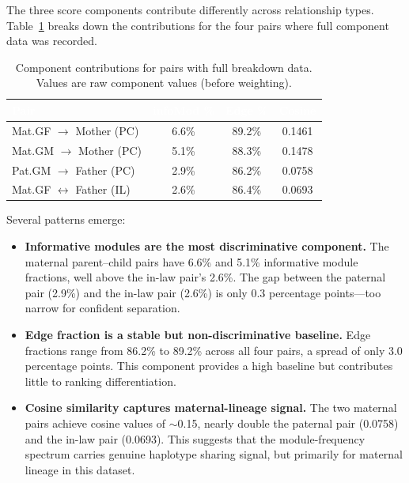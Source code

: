 \documentclass{../yalumba}
\begin{document}
The three score components contribute differently across relationship types.
Table~\ref{tab:components} breaks down the contributions for the four pairs
where full component data was recorded.

\begin{table}[htbp]
\centering
\tablestyle
\caption{Component contributions for pairs with full breakdown data.
  Values are raw component values (before weighting).}
\label{tab:components}
\begin{tabular}{@{}lccc@{}}
\toprule
\rowcolor{table-header}
\textcolor{white}{\textbf{Pair}} &
\textcolor{white}{\textbf{infoMod \%}} &
\textcolor{white}{\textbf{Edge \%}} &
\textcolor{white}{\textbf{Cosine}} \\
\midrule
Mat.GF $\to$ Mother (PC)        & 6.6\% & 89.2\% & 0.1461 \\
Mat.GM $\to$ Mother (PC)        & 5.1\% & 88.3\% & 0.1478 \\
Pat.GM $\to$ Father (PC)        & 2.9\% & 86.2\% & 0.0758 \\
Mat.GF $\leftrightarrow$ Father (IL) & 2.6\% & 86.4\% & 0.0693 \\
\bottomrule
\end{tabular}
\end{table}

Several patterns emerge:

\begin{itemize}
  \item \textbf{Informative modules are the most discriminative component.}
        The maternal parent--child pairs have 6.6\% and 5.1\% informative
        module fractions, well above the in-law pair's 2.6\%.  The gap between
        the paternal pair (2.9\%) and the in-law pair (2.6\%) is only 0.3
        percentage points---too narrow for confident separation.

  \item \textbf{Edge fraction is a stable but non-discriminative baseline.}
        Edge fractions range from 86.2\% to 89.2\% across all four pairs,
        a spread of only 3.0 percentage points.  This component provides a
        high baseline but contributes little to ranking differentiation.

  \item \textbf{Cosine similarity captures maternal-lineage signal.}
        The two maternal pairs achieve cosine values of $\sim$0.15, nearly
        double the paternal pair (0.0758) and the in-law pair (0.0693).  This
        suggests that the module-frequency spectrum carries genuine haplotype
        sharing signal, but primarily for maternal lineage in this dataset.
\end{itemize}
\end{document}
